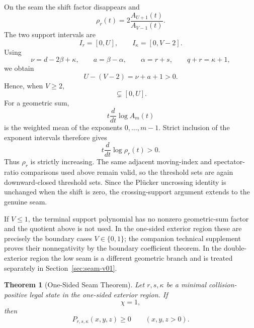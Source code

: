 \documentclass[11pt]{article}
\newtheorem{theorem}{Theorem}[section]
\theoremstyle{definition}
\begin{document}
On the seam the shift factor disappears and
\begin{equation*}
\rho_r(t)
=2\frac{A_{U+1}(t)}{A_{V-1}(t)}.
\end{equation*}
The two support intervals are
\begin{equation*}
I_r=[0,U],
\qquad
I_\kappa=[0,V-2].
\end{equation*}
Using
\begin{equation*}
\nu=d-2\beta+\kappa,
\qquad
a=\beta-\alpha,
\qquad
\alpha=r+s,
\qquad
q+r=\kappa+1,
\end{equation*}
we obtain
\begin{equation*}
U-(V-2)=\nu+a+1>0.
\end{equation*}
Hence, when \(V\ge2\),
\begin{equation*}
[0,V-2]\subsetneq[0,U].
\end{equation*}
For a geometric sum,
\begin{equation*}
t\frac{d}{dt}\log A_m(t)
\end{equation*}
is the weighted mean of the exponents \(0,\ldots,m-1\).  Strict inclusion of the exponent intervals therefore gives
\begin{equation*}
t\frac{d}{dt}\log\rho_r(t)>0.
\end{equation*}
Thus \(\rho_r\) is strictly increasing.  The same adjacent moving-index and spectator-ratio comparisons used above remain valid, so the threshold sets are again downward-closed threshold sets.  Since the Pl\"ucker uncrossing identity is unchanged when the shift is zero, the crossing-support argument extends to the genuine seam.

If \(V\le1\), the terminal support polynomial has no nonzero geometric-sum factor and the quotient above is not used.  In the one-sided exterior region these are precisely the boundary cases \(V\in\{0,1\}\); the companion technical supplement proves their nonnegativity by the boundary coefficient theorem.  In the double-exterior region the low seam is a different geometric branch and is treated separately in Section~\ref{sec:seam-v01}.

\begin{theorem}[One-Sided Seam Theorem]
\label{thm:genuine-seam-one-sided}
Let \(r,s,\kappa\) be a minimal collision-positive legal state in the one-sided exterior region. If
\begin{equation*}
\chi=1,
\end{equation*}
then
\begin{equation*}
P_{r,s,\kappa}(x,y,z)\ge0
\qquad(x,y,z>0).
\end{equation*}
\end{theorem}
\end{document}
